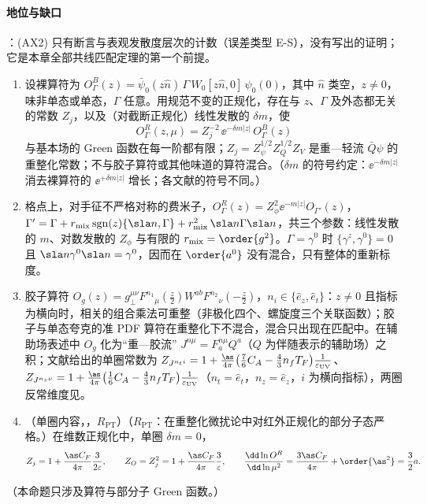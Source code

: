 \paragraph{地位与缺口}
\tagA：(AX2) 只有断言与表观发散度层次的计数（误差类型 E-S），没有写出的证明；它是本章全部共线匹配定理的第一个前提。

\begin{proposition}\label{prop:lattice-renormalizability}
\begin{enumerate}[label=(\alph*),leftmargin=2em,itemsep=1pt,topsep=2pt]
\item 设裸算符为 $O^B_\Gamma(z)=\bar\psi_0(z\hat n)\,\Gamma\, W_0[z\hat n,0]\,\psi_0(0)$，其中 $\hat n$ 类空，$z\neq0$，味非单态或单态，$\Gamma$ 任意。用规范不变的正规化，存在与 $z$、$\Gamma$ 及外态都无关的常数 $Z_j$，以及（对截断正规化）线性发散的 $\delta m$，使
\begin{equation}\label{eq:lamet-multren}
O^R_\Gamma(z,\mu)=Z_j^{-2}\,\ee^{-\delta m|z|}\,O^B_\Gamma(z)
\end{equation}
与基本场的 Green 函数在每一阶都有限；$Z_j=Z_\psi^{1/2}Z_Q^{1/2}Z_V$ 是重—轻流 $\bar Q\psi$ 的重整化常数；不与胶子算符或其他味道的算符混合。（$\delta m$ 的符号约定：$\ee^{-\delta m|z|}$ 消去裸算符的 $\ee^{+\delta m|z|}$ 增长；各文献的符号不同。）%
\item 格点上，对手征不严格对称的费米子，$O^R_\Gamma(z)=Z_\phi^2\ee^{-m|z|}O_{\Gamma'}(z)$，$\Gamma'=\Gamma+r_{\rm mix}\,{\rm sgn}(z)\{\sla n,\Gamma\}+r_{\rm mix}^2\,\sla n\Gamma\sla n$，共三个参数：线性发散的 $m$、对数发散的 $Z_\phi$ 与有限的 $r_{\rm mix}=\order{g^2}$。$\Gamma=\gamma^0$ 时 $\{\gamma^z,\gamma^0\}=0$ 且 $\sla n\gamma^0\sla n=\gamma^0$，因而在 $\order{a^0}$ 没有混合，只有整体的重新标度。
\item 胶子算符 $O_g(z)=g_\perp^{\mu\nu}F^{n_1}{}_\mu(\tfrac z2)W^{ab}F^{n_2}{}_\nu(-\tfrac z2)$，$n_i\in\{\hat e_z,\hat e_t\}$：$z\neq0$ 且指标为横向时，相关的组合乘法可重整（非极化四个、螺旋度三个关联函数）；胶子与单态夸克的准 PDF 算符在重整化下不混合，混合只出现在匹配中。在辅助场表述中 $O_g$ 化为“重—胶流” $J^{n\mu}=F^{n\mu}_aQ^a$（$Q$ 为伴随表示的辅助场）之积；文献\cite[第~III.A~节]{JiEtAl2021}给出的单圈常数为 $Z_{J^{n_ti}}=1+\frac{\as}{4\pi}\big(\frac76C_A-\frac43n_fT_F\big)\frac1{\varepsilon_{\rm UV}}$、$Z_{J^{n_z\nu}}=1+\frac{\as}{4\pi}\big(\frac16C_A-\frac43n_fT_F\big)\frac1{\varepsilon_{\rm UV}}$（$n_t=\hat e_t$，$n_z=\hat e_z$，$i$ 为横向指标），两圈反常维度见\cite{Braun:2020ymy}。
\item （单圈内容，\tagR，$R_{\mathrm{PT}}$）（$R_{\mathrm{PT}}$：在重整化微扰论中对红外正规化的部分子态严格。）在维数正规化中，单圈 $\delta m=0$，
\begin{equation}\label{eq:lamet-Zj}
Z_j=1+\frac{\as C_F}{4\pi}\frac3{2\varepsilon},\qquad Z_O=Z_j^2=1+\frac{\as C_F}{4\pi}\frac3\varepsilon,\qquad\frac{\dd\ln O^R}{\dd\ln\mu^2}=\frac{3\as C_F}{4\pi}+\order{\as^2}=\frac32a .
\end{equation}
\end{enumerate}
（本命题只涉及算符与部分子 Green 函数。）
\end{proposition}

